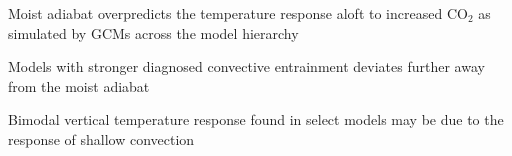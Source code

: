 \documentclass[draft]{agujournal2019}
\begin{document}




\begin{keypoints}
\item Moist adiabat overpredicts the temperature response aloft to increased CO$_2$ as simulated by GCMs across the model hierarchy
\item Models with stronger diagnosed convective entrainment deviates further away from the moist adiabat
\item Bimodal vertical temperature response found in select models may be due to the response of shallow convection
\end{keypoints}

%
%

%
%

\end{document}
